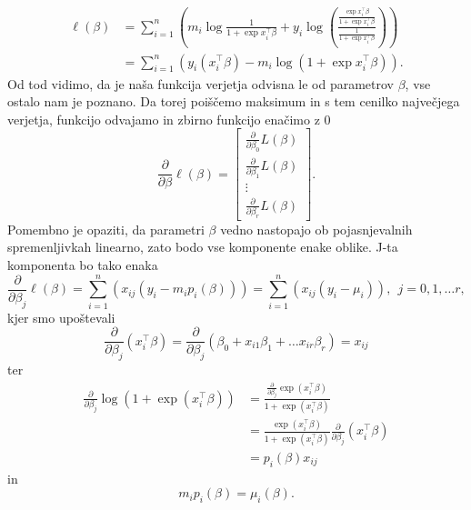 \documentclass[12pt,a4paper]{amsart}
\theoremstyle{definition} %
\theoremstyle{plain} %
\begin{document}
\begin{align}
    \ell(\beta)  &= \sum_{i=1}^{n}\left( m_{i}\log{\frac{1}{1 + \exp{x_{i}^\top\beta}}}  + y_{i}\log{\left( \frac{\frac{\exp{x_{i}^{\top} \beta}}{1 + \exp{x_{i}^\top\beta}}}{\frac{1}{1 + \exp{x_{i}^\top\beta}}}  \right)} \right) \nonumber\\
                &= \sum_{i=1}^{n}\left( y_{i}(x_{i}^\top\beta) - m_{i}\log(1 + \exp{x_{i}^\top\beta})\right).
\end{align}
Od tod vidimo, da je naša funkcija verjetja odvisna le od parametrov $\beta$, vse ostalo nam je poznano. Da torej poiščemo maksimum in s tem
cenilko največjega verjetja, funkcijo odvajamo in zbirno funkcijo enačimo z 0
\[
    \frac{\partial}{\partial \beta}\ell(\beta) = \begin{bmatrix}
                                 \frac{\partial}{\partial \beta_{0}}L(\beta) \\
                                 \frac{\partial}{\partial \beta_{1}}L(\beta) \\
                                 \vdots \\
                                 \frac{\partial}{\partial \beta_{r}}L(\beta)
                        \end{bmatrix}.
\]
Pomembno je opaziti, da parametri $\beta$ vedno nastopajo ob pojasnjevalnih spremenljivkah linearno, zato bodo vse komponente enake oblike.
J-ta komponenta bo tako enaka
\begin{equation}
    \frac{\partial}{\partial \beta_{j}} \ell(\beta) = \sum_{i=1}^{n} \left(x_{ij}(y_{i} - m_{i}p_{i}(\beta))\right) = \sum_{i=1}^{n} \left(x_{ij}(y_{i} - \mu_{i})\right),~~j = 0,1,\ldots r,
\end{equation}
kjer smo upoštevali
\[
    \frac{\partial}{\partial \beta_{j}}(x_{i}^\top\beta) = \frac{\partial}{\partial \beta_{j}}\left(\beta_{0} + x_{i1}\beta_{1} + \ldots x_{ir}\beta_{r}\right) = x_{ij}
\]
ter
\begin{align}                                         
    \frac{\partial}{\partial \beta_{j}} \log(1 + \exp(x_{i}^\top\beta)) &= \frac{ \frac{\partial}{\partial \beta_{j}}\exp(x_{i}^\top\beta) }{1 + \exp(x_{i}^\top\beta)} \nonumber \\
    &= \frac{\exp(x_{i}^\top\beta)}{1 + \exp(x_{i}^\top\beta)} \frac{\partial}{\partial \beta_{j}} (x_{i}^\top\beta) \nonumber \\
    &=p_{i}(\beta)x_{ij}
\end{align}
in
\[
    m_{i}p_{i}(\beta) = \mu_{i}(\beta).
\]
\end{document}
